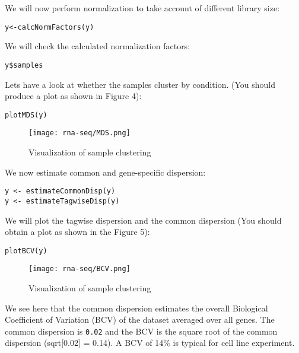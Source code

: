 \begin{steps}
We will now perform normalization to take account of different library size:
\begin{lstlisting}
y<-calcNormFactors(y)
\end{lstlisting}

We will check the calculated normalization factors:
\begin{lstlisting}
y$samples
\end{lstlisting}

Lets have a look at whether the samples cluster by condition. (You should produce a plot
as shown in Figure 4):
\begin{lstlisting}
plotMDS(y)
\end{lstlisting}
\end{steps}

\begin{figure}[H]
\centering
\texttt{[image: rna-seq/MDS.png]}
\caption{Visualization of sample clustering}
\label{fig:MDS plot}
\end{figure}


\begin{steps}
We now estimate common and gene-specific dispersion:
\begin{lstlisting}
y <- estimateCommonDisp(y) 
y <- estimateTagwiseDisp(y) 
\end{lstlisting}

We will plot the tagwise dispersion and the common dispersion (You should obtain a plot as shown in the Figure 5):
\begin{lstlisting}
plotBCV(y)
\end{lstlisting}

\end{steps}
\begin{figure}[H]
\centering
\texttt{[image: rna-seq/BCV.png]}
\caption{Visualization of sample clustering}
\label{fig:BCV plot}
\end{figure}

\begin{information}
We see here that the common dispersion estimates the overall Biological Coefficient of
Variation (BCV) of the dataset averaged over all genes. The common dispersion is
\texttt{0.02} and the BCV is the square root of the common dispersion (sqrt[0.02] = 0.14).
A BCV of 14\% is typical for cell line experiment.
\end{information}

